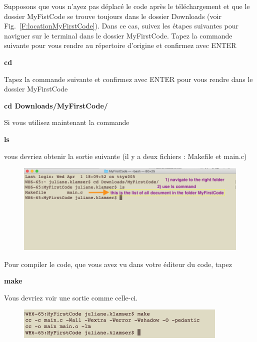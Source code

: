 \documentclass{article}
\newcommand\fig[1]{{Fig.~\ref{#1}}}
\begin{document}
Supposons que vous n'ayez pas déplacé le code après le téléchargement et que le dossier MyFistCode se trouve toujours dans le dossier Downloads (voir \fig{F:locationMyFirstCode}). Dans ce cas, suivez les étapes suivantes pour naviguer sur le terminal dans le dossier MyFirstCode.
Tapez la commande suivante pour vous rendre au répertoire d'origine et confirmez avec ENTER
\begin{tcolorbox}[width=\textwidth,colframe=Bittersweet,colback={black},title={Ceci est le terminal},outer arc=0mm,colupper=white]    
      \large\textbf{cd}
\end{tcolorbox}
Tapez la commande suivante et confirmez avec ENTER pour vous rendre dans le dossier MyFirstCode
\begin{tcolorbox}[width=\textwidth,colframe=Bittersweet,colback={black},title={Ceci est le terminal},outer arc=0mm,colupper=white]    
      \large\textbf{ cd Downloads/MyFirstCode/}
\end{tcolorbox}
Si vous utilisez maintenant la commande 
\begin{tcolorbox}[width=\textwidth,colframe=Bittersweet,colback={black},title={Ceci est le terminal},outer arc=0mm,colupper=white]    
      \large\textbf{ ls}
\end{tcolorbox}
vous devriez obtenir la sortie suivante (il y a deux fichiers : Makefile et main.c)
\begin{figure}[H]
\center
\includegraphics[width=1\textwidth]{Plots/navigateToMyFirstCode.png}
\end{figure}
Pour compiler le code, que vous avez vu dans votre éditeur du code, tapez
\begin{tcolorbox}[width=\textwidth,colframe=Bittersweet,colback={black},title={Ceci est le terminal},outer arc=0mm,colupper=white]   
      \large\textbf{ make}
\end{tcolorbox}
Vous devriez voir une sortie comme celle-ci.
\begin{figure}[H]
\center
\includegraphics[width=0.9\textwidth]{Plots/FirstCode_6.png}
\end{figure}
\end{document}
